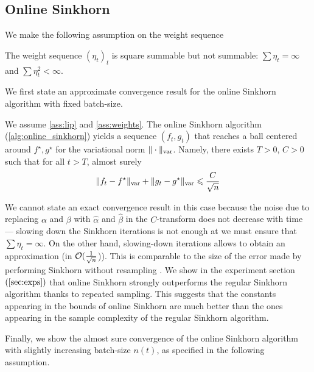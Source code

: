 \subsection{Online Sinkhorn}

We make the following \citet{robbins1951stochastic} assumption on the weight sequence

\begin{assumption}\label{ass:weights}
    The weight sequence ${(\eta_t)}_t$ is square summable but not summable: 
    $\sum \eta_t = \infty$ and $\sum \eta_t^2 < \infty$.
\end{assumption}


We first state an approximate convergence result for the online Sinkhorn algorithm with fixed batch-size.

\begin{proposition}\label{prop:convergence_bis}
    We assume \autoref{ass:lip} and \ref{ass:weights}. The online Sinkhorn algorithm (\autoref{alg:online_sinkhorn}) yields a sequence $(f_t, g_t)$ that reaches a
    ball centered around $f^\star, g^\star$ for the variational norm $\Vert
    \cdot \Vert_{\text{\upshape var}}$.
     Namely, there exists $T > 0$, $C > 0$ such that for all $t > T$, almost surely
    \begin{equation}
        \Vert f_t - f^\star \Vert_{\text{\upshape var}}
        + \Vert g_t - g^\star \Vert_{\text{\upshape var}} 
        \leqslant \frac{C}{\sqrt{n}} 
    \end{equation}
\end{proposition}
We cannot state an exact convergence result in this case because the noise due
to replacing $\alpha$ and $\beta$ with $\hat \alpha$ and $\hat \beta$ in the
$C$-transform does not decrease with time --- slowing down the Sinkhorn
iterations is not enough at we must ensure that $\sum \eta_t = \infty$. On the
other hand, slowing-down iterations allows to obtain an approximation (in
$\mathcal{O}(\frac{1}{\sqrt{n}}$)). This is comparable to the size of the error made by
performing Sinkhorn without resampling \citep{2019-Genevay-aistats}.  We show in
the experiment section $(\autoref{sec:exps})$ that online Sinkhorn strongly
outperforms the regular Sinkhorn algorithm thanks to repeated sampling. This
suggests that the constants appearing in the bounds of online Sinkhorn are much
better than the ones appearing in the sample complexity of the regular Sinkhorn
algorithm.

Finally, we show the almost sure convergence of the online Sinkhorn algorithm with slightly increasing batch-size $n(t)$, as specified in the following assumption.

